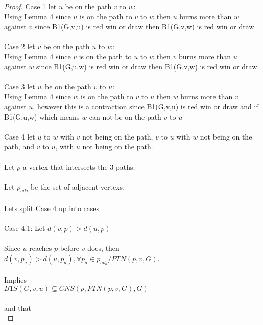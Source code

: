 \documentclass{article}
\begin{document}
\begin{proof}

Case 1 let \(u\) be on the path \(v\) to \(w\): 
\\

Using Lemma 4 since \(u\) is on the path to \(v\) to \(w\) then \(u\) burns more than \(w\) against \(v\) since B1(G,v,u) is red win or draw then B1(G,v,w) is red win or draw
\\ \\
Case 2 let \(v\) be on the path \(u\) to \(w\):\\

Using Lemma 4 since \(v\) is on the path to \(u\) to \(w\) then \(v\) burns more than \(u\) against \(w\) since B1(G,u,w) is red win or draw then B1(G,v,w) is red win or draw
\\ \\
Case 3 let \(w\) be on the path \(v\) to \(u\):\\

Using Lemma 4 since \(w\) is on the path to \(v\) to \(u\) then \(w\) burns more than \(v\) against \(u\), however this is a contraction since B1(G,v,u) is red win or draw and if B1(G,u,w) which means \(w\) can not be on the path \(v\) to \(u\)
\\ \\
Case 4 let \(u\) to \(w\) with \(v\)  not being on the path, \(v\) to \(u\)  with \(w\)  not being on the path, and \(v\) to \(u\),  with \(u\)  not being on the path.
\\ \\
Let \(p\) a vertex that intersects the 3 paths.
\\ \\
Let \(p_{adj}\) be the set of adjacent vertexs.
\\\\
Lets split Case 4 up into cases
\\\\
Case 4.1: Let \(d(v,p) > d(u,p)\) \\\\
Since \(u\) reaches \(p\) before \(v\) does, then 
\\

\(d(v,p_a) > d(u,p_a), \forall p_a \in p_{adj}/PTN(p,v,G)\).
\\\\
Implies
\\

\(B1S(G,v,u) \subseteq CNS(p,PTN(p,v,G),G)\) 
\\\\
and that 
\\


\end{proof}
\end{document}
